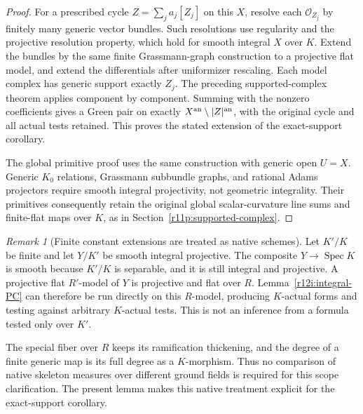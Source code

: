 \documentclass[11pt,a4paper]{article}
\theoremstyle{definition}
\theoremstyle{remark}
\newtheorem{remark}[theorem]{Remark}
\begin{document}
\begin{proof}
For a prescribed cycle $Z=\sum_j a_j[Z_j]$ on this $X$, resolve each
$\mathcal O_{Z_j}$ by finitely many generic vector bundles.  Such
resolutions use regularity and the projective resolution property,
which hold for smooth integral $X$ over $K$.  Extend the bundles by
the same finite Grassmann-graph construction to a projective flat
model, and extend the differentials after uniformizer rescaling.
Each model complex has generic support exactly $Z_j$.  The preceding
supported-complex theorem applies component by component.  Summing
with the nonzero coefficients gives a Green pair on exactly
$X^{\rm an}\setminus|Z|^{\rm an}$, with the original cycle and all
actual tests retained.  This proves the stated extension of the
exact-support corollary.

The global primitive proof uses the same construction with generic
open $U=X$.  Generic $K_0$ relations, Grassmann subbundle graphs,
and rational Adams projectors require smooth integral projectivity,
not geometric integrality.  Their primitives consequently retain
the original global scalar-curvature line sums and finite-flat maps
over $K$, as in Section~\ref{r11p:supported-complex}.
\end{proof}

\begin{remark}[Finite constant extensions are treated as native schemes]
Let $K'/K$ be finite and let $Y/K'$ be smooth integral projective.
The composite $Y\to\operatorname{Spec}K$ is smooth because
$K'/K$ is separable, and it is still integral and projective.
A projective flat $R'$-model of $Y$ is projective and flat over $R$.
Lemma~\ref{r12i:integral-PC} can therefore be run directly on this
$R$-model, producing $K$-actual forms and testing against arbitrary
$K$-actual tests.  This is not an inference from a formula tested
only over $K'$.

The special fiber over $R$ keeps its ramification thickening, and
the degree of a finite generic map is its full degree as a
$K$-morphism.  Thus no comparison of native skeleton measures over
different ground fields is required for this scope clarification.
The present lemma makes this native treatment explicit for the
exact-support corollary.
\end{remark}
\end{document}
